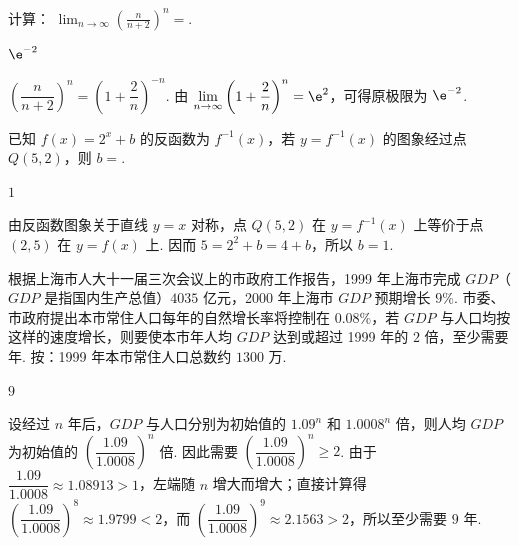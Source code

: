 \begin{problem}
计算： \( \displaystyle\lim_{n\to\infty}\left(\frac{n}{n+2}\right)^n = \)\fillinblank{}.
\end{problem}

\begin{answer}
\(\e^{-2}\)
\end{answer}

\begin{solution}
\(\left(\dfrac{n}{n+2}\right)^n=\left(1+\dfrac{2}{n}\right)^{-n}\). 由 \(\displaystyle\lim_{n\to\infty}\left(1+\dfrac{2}{n}\right)^n=\e^2\)，可得原极限为 \(\e^{-2}\).
\end{solution}

\begin{problem}
已知 \( f(x) = 2^{x} + b \) 的反函数为 \( f^{-1}(x) \)，若 \( y = f^{-1}(x) \) 的图象经过点 \( Q(5,2) \)，则 \(b=\)\fillinblank{}.
\end{problem}

\begin{answer}
\(1\)
\end{answer}

\begin{solution}
由反函数图象关于直线 \(y=x\) 对称，点 \(Q(5,2)\) 在 \(y=f^{-1}(x)\) 上等价于点 \((2,5)\) 在 \(y=f(x)\) 上. 因而 \(5=2^2+b=4+b\)，所以 \(b=1\).
\end{solution}

\begin{problem}
根据上海市人大十一届三次会议上的市政府工作报告，1999 年上海市完成 \(GDP\)（\(GDP\) 是指国内生产总值）\(4035\text{ 亿元}\)，2000 年上海市 \(GDP\) 预期增长 \(9\%\). 市委、市政府提出本市常住人口每年的自然增长率将控制在 \(0.08\%\)，若 \(GDP\) 与人口均按这样的速度增长，则要使本市年人均 \(GDP\) 达到或超过 1999 年的 \(2\text{ 倍}\)，至少需要\fillinblank{}\(\text{年}\). 按：1999 年本市常住人口总数约 \(1300\text{ 万}\).
\end{problem}

\begin{answer}
\(9\)
\end{answer}

\begin{solution}
设经过 \(n\) 年后，\(GDP\) 与人口分别为初始值的 \(1.09^n\) 和 \(1.0008^n\) 倍，则人均 \(GDP\) 为初始值的 \(\left(\dfrac{1.09}{1.0008}\right)^n\) 倍. 因此需要
\(\left(\dfrac{1.09}{1.0008}\right)^n\geqslant2\). 由于 \(\dfrac{1.09}{1.0008}\approx1.08913>1\)，左端随 \(n\) 增大而增大；直接计算得 \(\left(\dfrac{1.09}{1.0008}\right)^8\approx1.9799<2\)，而 \(\left(\dfrac{1.09}{1.0008}\right)^9\approx2.1563>2\)，所以至少需要 \(9\) 年.
\end{solution}

